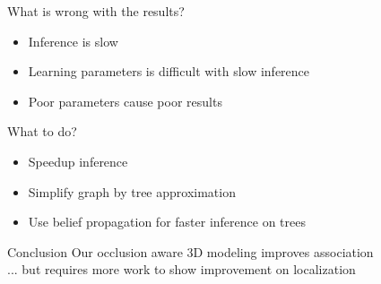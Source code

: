 \begin{frame}{What is wrong with the results?}
  \begin{itemize}
    \item Inference is slow
    \item Learning parameters is difficult with slow inference
    \item Poor parameters cause poor results
  \end{itemize}
\end{frame}
\begin{frame}{What to do?}
  \begin{itemize}
    \item Speedup inference
    \item Simplify graph by \cite{chow1968approximating} tree approximation
    \item Use belief propagation for faster inference on trees
  \end{itemize}
  
\end{frame}

\begin{frame}{Conclusion}
    Our occlusion aware 3D modeling improves association\\
    ... but requires more work to show improvement on localization
\end{frame}

